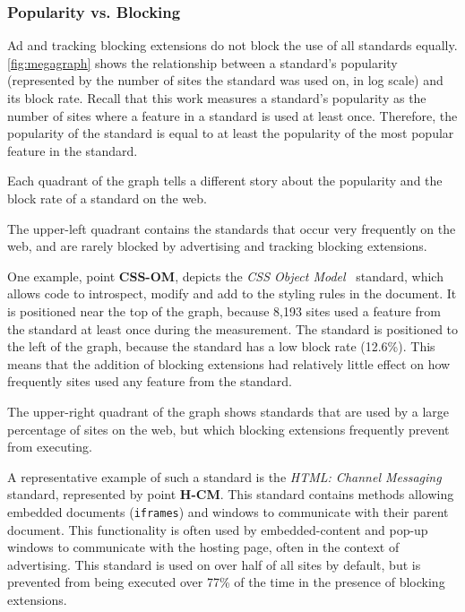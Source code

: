 \subsubsection{Popularity vs. Blocking}
\label{sec:results-feature-popularity}

Ad and tracking blocking extensions do not block the use of all standards
equally.  \ref{fig:megagraph} shows the relationship between a standard's
popularity (represented by the number of sites the standard was used on, in log
scale) and its block rate.  Recall that this work measures a standard's
popularity as the number of sites where a feature in a standard is used at
least once.  Therefore, the popularity of the standard is equal to at least the
popularity of the most popular feature in the standard.

Each quadrant of the graph tells a different story about the popularity and the
block rate of a standard on the web.

The upper-left quadrant contains the standards that occur very frequently on
the web, and are rarely blocked by advertising and tracking blocking
extensions.

One example, point \textbf{CSS-OM}, depicts the \textit{CSS Object
Model}~\cite{cssomw3c} standard, which allows \JS code to introspect, modify
and add to the styling rules in the document.  It is positioned near the top of
the graph, because 8,193 sites used a feature from the standard at least once
during the measurement.  The standard is positioned to the left of the graph,
because the standard has a low block rate (12.6\%). This means that the addition
of blocking extensions had relatively little effect on how frequently sites
used any feature from the standard.

The upper-right quadrant of the graph shows standards that are used by a large
percentage of sites on the web, but which blocking extensions frequently
prevent from executing.

A representative example of such a standard is the \textit{HTML: Channel
Messaging} ~\cite{htmlcmw3c} standard, represented by point \textbf{H-CM}.
This standard contains \JS methods allowing embedded documents
(\texttt{iframes}) and windows to communicate with their parent document.  This
functionality is often used by embedded-content and pop-up windows to
communicate with the hosting page, often in the context of advertising.  This
standard is used on over half of all sites by default, but is prevented from
being executed over 77\% of the time in the presence of blocking extensions.

